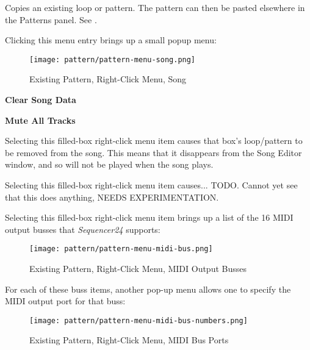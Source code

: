    Copies an existing loop or pattern.
   The pattern can then be pasted elsewhere in the Patterns panel.
   See .

   Clicking this menu entry brings up a small popup menu:

\begin{figure}[H]
   \centering 
   \texttt{[image: pattern/pattern-menu-song.png]}
   \caption{Existing Pattern, Right-Click Menu, Song}
   \label{fig:pattern_window_right_click_song}
\end{figure}

   \begin{enumber}
      \item \textbf{Clear Song Data}
      \item \textbf{Mute All Tracks}
   \end{enumber}

   \setcounter{ItemCounter}{0}      %

   Selecting this filled-box right-click menu item causes that box's
   loop/pattern to be removed from the song.  This means
   that it disappears from the Song Editor window, and so will not
   be played when the song plays.

   Selecting this filled-box right-click menu item causes...
   TODO.  
   Cannot yet see that this does anything, NEEDS EXPERIMENTATION.

   Selecting this filled-box right-click menu item brings up a list
   of the 16 MIDI output busses that \textsl{Sequencer24} supports:

\begin{figure}[H]
   \centering 
   \texttt{[image: pattern/pattern-menu-midi-bus.png]}
   \caption{Existing Pattern, Right-Click Menu, MIDI Output Busses}
   \label{fig:pattern_window_right_click_midi_bus}
\end{figure}

   For each of these buss items, another pop-up menu allows one
   to specify the MIDI output port for that buss:

\begin{figure}[H]
   \centering 
   \texttt{[image: pattern/pattern-menu-midi-bus-numbers.png]}
   \caption{Existing Pattern, Right-Click Menu, MIDI Bus Ports}
   \label{fig:pattern_window_right_click_midi_bus_numbers}
\end{figure}

